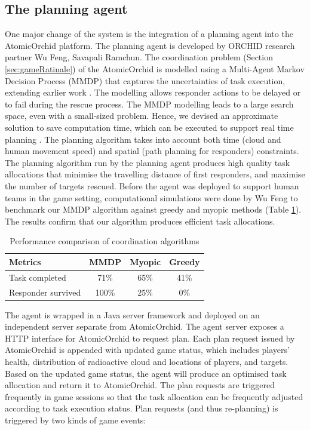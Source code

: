 \subsection{The planning agent}\label{sec:studyoneagent}
One major change of the system is the integration of a planning agent into the AtomicOrchid platform. The planning agent is developed by ORCHID research partner Wu Feng, Savapali Ramchun. The coordination problem (Section \ref{sec:gameRatinale}) of the AtomicOrchid is modelled using a Multi-Agent Markov Decision Process (MMDP) that captures the uncertainties of task execution, extending earlier work \cite{Ramchurn2010}. The modelling allows responder actions to be delayed or to fail during the rescue process. The MMDP modelling leads to a large search space, even with a small-sized problem. Hence, we devised an approximate solution to save computation time, which can be executed to support real time planning \cite{Wu2015}. The planning algorithm takes into account both time (cloud and human movement speed) and spatial (path planning for responders) constraints. The planning algorithm run by the planning agent produces high quality task allocations that minimise the travelling distance of first responders, and maximise the number of targets rescued. Before the agent was deployed to support human teams in the game setting, computational simulations were done by Wu Feng to benchmark our MMDP algorithm against greedy and myopic methods (Table  \ref{tab:alg}). The results confirm that our algorithm produces efficient task allocations.\\

\begin{table}[h]
\footnotesize
\centering
\begin{tabular}{l|ccc}
Metrics            & \multicolumn{1}{l}{MMDP} & \multicolumn{1}{l}{Myopic} & \multicolumn{1}{l}{Greedy} \\ \hline
Task completed     & 71\%                     & 65\%                       & 41\%                       \\
Responder survived & 100\%                    & 25\%                       & 0\%                       
\end{tabular}
\caption{Performance comparison of coordination algorithms}
\label{tab:alg}
\end{table}

The agent is wrapped in a Java server framework and deployed on an independent server separate from AtomicOrchid. The agent server exposes a HTTP interface for AtomicOrchid to request plan. Each plan request issued by AtomicOrchid is appended with updated game status, which includes players' health, distribution of radioactive cloud and locations of players, and targets. Based on the updated game status, the agent will produce an optimised task allocation and return it to AtomicOrchid. The plan requests are triggered frequently in game sessions so that the task allocation can be frequently adjusted according to task execution status. Plan requests (and thus re-planning) is triggered by two kinds of game events:\\


